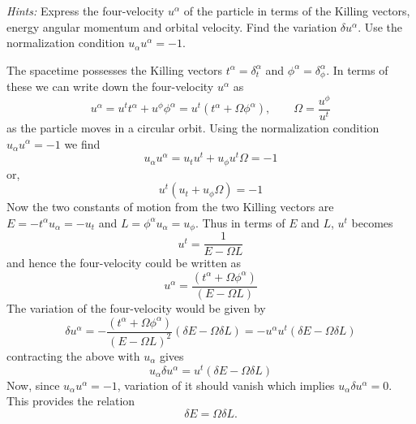 \documentclass{article}
\begin{document}
\begin{enumerate}
  {\itshape Hints:} Express the four-velocity $u^\alpha$ of the particle in terms of the Killing vectors, energy angular momentum and orbital velocity. Find the variation $\delta u^\alpha$. Use the normalization condition $u_\alpha u^\alpha = -1$.

   The spacetime possesses the Killing vectors $t^\alpha = \delta^\alpha_t$ and $\phi^\alpha = \delta^\alpha_\phi$. In terms of these we can write down the four-velocity $u^\alpha$ as
  \begin{equation}
    \label{eq:four-velocity}
    u^\alpha = u^t t^\alpha + u^\phi \phi^\alpha = u^t(t^\alpha + \Omega \phi^\alpha),\qquad \Omega = \frac{u^\phi}{u^t}
  \end{equation}
  as the particle moves in a circular orbit. Using the normalization condition $u_\alpha u^\alpha = -1$ we find
  \begin{equation}
    \label{eq:normalization-condition}
    u_\alpha u^\alpha = u_tu^t + u_\phi u^t\Omega = -1
  \end{equation}
  or,
  \begin{equation}
    \label{eq:normalization-condition-2}
    u^t(u_t + u_\phi \Omega) = -1
  \end{equation}
  Now the two constants of motion from the two Killing vectors are $E = - t^\alpha u_\alpha = -u_t$ and $L = \phi^\alpha u_\alpha = u_\phi$. Thus in terms of $E$ and $L$, $u^t$ becomes
  \begin{equation}
    \label{eq:u^t}
    u^t = \frac{1}{E - \Omega L}
  \end{equation}
  and hence the four-velocity could be written as
  \begin{equation}
    \label{eq:four-velocity-2}
    u^\alpha = \frac{(t^\alpha + \Omega \phi^\alpha)}{(E -\Omega L)}
  \end{equation}
  The variation of the four-velocity would be given by
  \begin{equation}
    \label{eq:variation-u^alpha}
    \delta u^\alpha = -\frac{(t^\alpha + \Omega \phi^\alpha)}{(E -\Omega L)^2}(\delta E - \Omega \delta L) = - u^\alpha u^t (\delta E - \Omega \delta L)
  \end{equation}
  contracting the above with $u_\alpha$ gives
  \begin{equation}
    \label{eq:u_alpha-delta-u^alpha}
    u_\alpha \delta u^\alpha = u^t(\delta E - \Omega \delta L)
  \end{equation}
  Now, since $u_\alpha u^\alpha = -1$, variation of it should vanish which implies $u_\alpha \delta u^\alpha = 0$. This provides the relation
  \begin{equation}
    \label{eq:deltaE-deltaL}
    \boxed{\delta E = \Omega \delta L}.
  \end{equation}
\end{enumerate}
\end{document}
